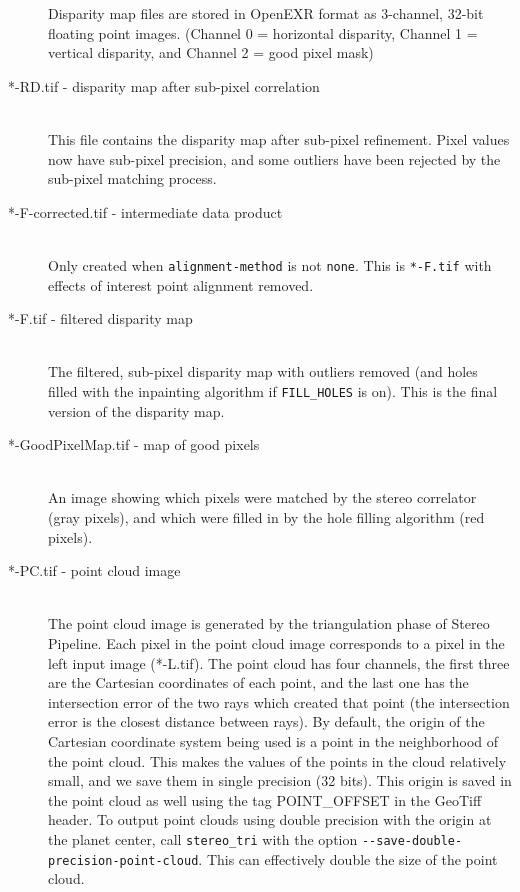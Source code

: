 \begin{description}
  Disparity map files are stored in OpenEXR format as 3-channel,
  32-bit floating point images.  (Channel 0 = horizontal disparity,
  Channel 1 = vertical disparity, and Channel 2 = good pixel mask)

\item[*-RD.tif - \textnormal{disparity map after sub-pixel correlation}] \hfill \\
  This file contains the disparity map after sub-pixel refinement.
  Pixel values now have sub-pixel precision, and some outliers have
  been rejected by the sub-pixel matching process.

\item[*-F-corrected.tif \textnormal{- intermediate data product}] \hfill \\
  Only created when \texttt{alignment-method} is not \texttt{none}.
  This is \texttt{*-F.tif} with effects of interest point alignment removed.

\item[*-F.tif \textnormal{- filtered disparity map}] \hfill \\
  The filtered, sub-pixel disparity map with outliers removed (and
  holes filled with the inpainting algorithm if \texttt{FILL\_HOLES}
  is on). This is the final version of the disparity map.

\item[*-GoodPixelMap.tif \textnormal{- map of good pixels}] \hfill \\
  An image showing which pixels were matched by the stereo correlator
  (gray pixels), and which were filled in by the hole filling
  algorithm (red pixels).

\item[*-PC.tif \textnormal{- point cloud image}] \hfill \\ The point
cloud image is generated by the triangulation phase of Stereo Pipeline.
Each pixel in the point cloud image corresponds to a pixel in the left
input image (*-L.tif). The point cloud has four channels, the first
three are the Cartesian coordinates of each point, and the last one has
the intersection error of the two rays which created that point (the
intersection error is the closest distance between rays).  By default,
the origin of the Cartesian coordinate system being used is a point in
the neighborhood of the point cloud. This makes the values of the points
in the cloud relatively small, and we save them in single precision (32
bits). This origin is saved in the point cloud as well using the tag
POINT\_OFFSET in the GeoTiff header. To output point clouds using double
precision with the origin at the planet center, call {\tt stereo\_tri}
with the option {\tt -\/-save-double-precision-point-cloud}. This can
effectively double the size of the point cloud.


\end{description}
